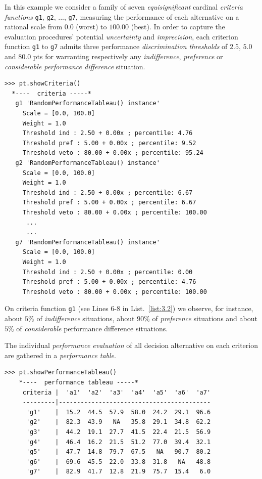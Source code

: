 In this example we consider a family of seven \emph{equisignificant} cardinal \emph{criteria functions} \texttt{g1}, \texttt{g2}, ..., \texttt{g7}, measuring the performance of each alternative on a rational scale from $0.0$ (worst) to $100.00$ (best). In order to capture the evaluation procedures' potential \emph{uncertainty} and \emph{imprecision}, each criterion function \texttt{g1} to \texttt{g7} admits three performance \emph{discrimination thresholds} of $2.5$, $5.0$ and $80.0$ pts for warranting respectively any \emph{indifference}, \emph{preference} or \emph{considerable performance difference} situation.
\begin{lstlisting}[caption={Inspecting the performance criteria.},label=list:3.2]
>>> pt.showCriteria()
  *----  criteria -----*
   g1 'RandomPerformanceTableau() instance'
     Scale = [0.0, 100.0]
     Weight = 1.0
     Threshold ind : 2.50 + 0.00x ; percentile: 4.76
     Threshold pref : 5.00 + 0.00x ; percentile: 9.52
     Threshold veto : 80.00 + 0.00x ; percentile: 95.24
   g2 'RandomPerformanceTableau() instance'
     Scale = [0.0, 100.0]
     Weight = 1.0
     Threshold ind : 2.50 + 0.00x ; percentile: 6.67
     Threshold pref : 5.00 + 0.00x ; percentile: 6.67
     Threshold veto : 80.00 + 0.00x ; percentile: 100.00
      ...
      ...
   g7 'RandomPerformanceTableau() instance'
     Scale = [0.0, 100.0]
     Weight = 1.0
     Threshold ind : 2.50 + 0.00x ; percentile: 0.00
     Threshold pref : 5.00 + 0.00x ; percentile: 4.76
     Threshold veto : 80.00 + 0.00x ; percentile: 100.00
\end{lstlisting}

On criteria function \texttt{g1} (see Lines 6-8 in List.~\vref{list:3.2}) we observe, for instance, about $5\%$ of \emph{indifference} situations, about $90\%$ of \emph{preference} situations and about $5\%$ of \emph{considerable} performance difference situations.

The individual \emph{performance evaluation} of all decision alternative on each criterion are gathered in a \emph{performance table}.
\begin{lstlisting}[caption={Inspecting the performance evaluations},label=list:3.3]
>>> pt.showPerformanceTableau()
    *----  performance tableau -----*
     criteria |  'a1'  'a2'  'a3'  'a4'  'a5'  'a6'  'a7'   
     ---------|------------------------------------------
      'g1'    |  15.2  44.5  57.9  58.0  24.2  29.1  96.6  
      'g2'    |  82.3  43.9   NA   35.8  29.1  34.8  62.2  
      'g3'    |  44.2  19.1  27.7  41.5  22.4  21.5  56.9  
      'g4'    |  46.4  16.2  21.5  51.2  77.0  39.4  32.1  
      'g5'    |  47.7  14.8  79.7  67.5   NA   90.7  80.2  
      'g6'    |  69.6  45.5  22.0  33.8  31.8   NA   48.8  
      'g7'    |  82.9  41.7  12.8  21.9  75.7  15.4   6.0  
\end{lstlisting}


